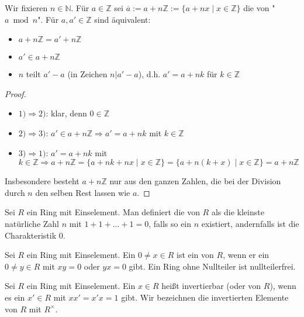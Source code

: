 \begin{example}[Restklassenring]
	Wir fixieren $n \in \mathbb{N}$. Für $a \in \mathbb{Z}$ sei
	$\overline{a} := a+n\mathbb{Z} := \{a+nx \mid x \in \mathbb{Z}\}$ die  von "$a \bmod n$". 
	Für $a,a' \in \mathbb{Z}$ sind äquivalent:
	\begin{itemize}
		\item $a+n\mathbb{Z}=a'+n\mathbb{Z}$
		\item $a' \in a+n\mathbb{Z}$
		\item $n$ teilt $a'-a$ (in Zeichen $n|a'-a$), d.h. $a'=a+nk$ für $k \in \mathbb{Z}$
	\end{itemize}
\end{example}
\begin{proof}
	\begin{itemize}
		\item $1) \Rightarrow 2)$: klar, denn $0 \in \mathbb{Z}$
		\item $2) \Rightarrow 3)$: $a' \in a+n\mathbb{Z} \Rightarrow a'=a+nk$ mit $k \in \mathbb{Z}$
		\item $3) \Rightarrow 1)$: $a'=a+nk$ mit $k \in \mathbb{Z} \Rightarrow a+n\mathbb{Z}=\{a+nk+nx \mid 
		x \in \mathbb{Z}\}=\{a+n(k+x) \mid x \in \mathbb{Z}\}=a+n\mathbb{Z}$
	\end{itemize}
	Insbesondere besteht $a+n\mathbb{Z}$ nur aus den ganzen Zahlen, die bei der Division durch $n$ den selben Rest lassen wie $a$.
\end{proof}

\begin{definition}[Charakteristik]
	Sei $R$ ein Ring mit Einselement. Man definiert die  von
	$R$ als die kleinste natürliche Zahl $n$ mit $1+1+...+1=0$, falls so ein $n$ existiert, andernfalls
	ist die Charakteristik $0$.
\end{definition}

\begin{definition}[Nullteiler]
	Sei $R$ ein Ring mit Einselement. Ein $0 \neq x \in R$ ist ein  von 
	$R$, wenn er ein $0 \neq y \in R$ mit $xy=0$ oder $yx=0$ gibt. Ein Ring ohne Nullteiler ist
	nullteilerfrei.
\end{definition}

\begin{definition}[Einheit]
	Sei $R$ ein Ring mit Einselement. Ein $x \in R$ heißt invertierbar (oder
	 von $R$), wenn es ein $x' \in R$ mit $xx'=x'x=1$ gibt. Wir bezeichnen die invertierten
	Elemente von $R$ mit $R^{\times}$.
\end{definition}